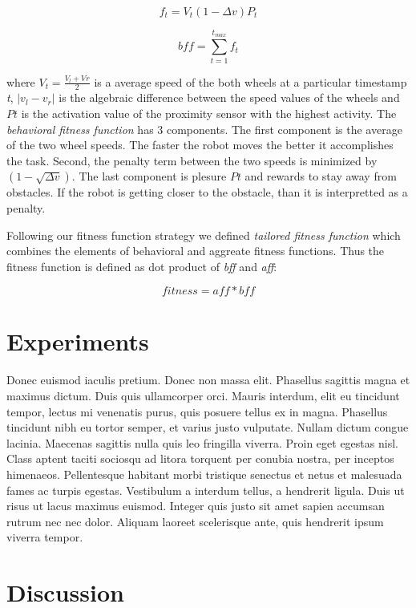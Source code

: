 \documentclass[format=acmsmall, review=false, screen=true]{acmart}
\begin{document}
\[ f_{t} = V_{t}(1-\Delta v)P_{t} \]

\[ bff = \sum_{t=1}^{t_{max}} f_{t} \]


where \(V_{t} = \frac{V_{l} + V_{}r}{2} \) is a average speed of the both wheels at a particular timestamp \emph{t}, \(|v_{l} - v_{r}|\) is the algebraic difference between the speed values of the wheels and \(P{t}\) is the activation value of the proximity sensor with the highest activity. The \emph{behavioral fitness function} has 3 components. The first component is the average of the two wheel speeds. The faster the robot moves the better it accomplishes the task. Second, the penalty term between the two speeds is minimized by \((1-\sqrt{\Delta v})\). The last component is plesure \(P{t}\) and rewards to stay away from obstacles. If the robot is getting closer to the obstacle, than it is interpretted as a penalty.

Following our fitness function strategy we defined \emph{tailored fitness function} which combines the elements of behavioral and aggreate fitness functions. Thus the fitness function is defined as dot product of \emph{bff} and \emph{aff}:

\[ fitness = aff * bff \]

\section{Experiments}

Donec euismod iaculis pretium. Donec non massa elit. Phasellus sagittis magna et maximus dictum. Duis quis ullamcorper orci. Mauris interdum, elit eu tincidunt tempor, lectus mi venenatis purus, quis posuere tellus ex in magna. Phasellus tincidunt nibh eu tortor semper, et varius justo vulputate. Nullam dictum congue lacinia. Maecenas sagittis nulla quis leo fringilla viverra. Proin eget egestas nisl. Class aptent taciti sociosqu ad litora torquent per conubia nostra, per inceptos himenaeos. Pellentesque habitant morbi tristique senectus et netus et malesuada fames ac turpis egestas. Vestibulum a interdum tellus, a hendrerit ligula. Duis ut risus ut lacus maximus euismod. Integer quis justo sit amet sapien accumsan rutrum nec nec dolor. Aliquam laoreet scelerisque ante, quis hendrerit ipsum viverra tempor.

\section{Discussion}
\end{document}
